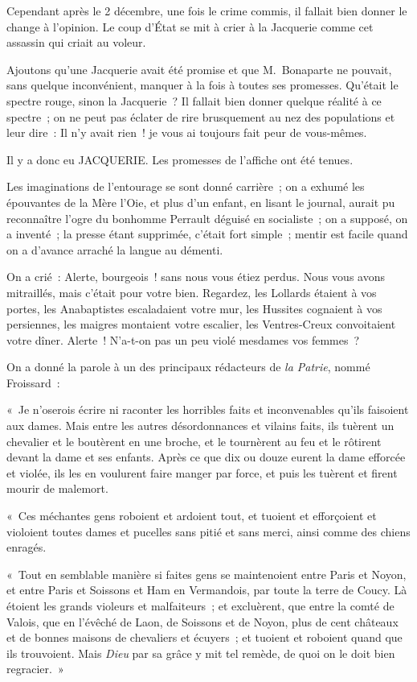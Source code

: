 \documentclass[french,twoside]{book} %
\newenvironment{quoteblock}%
  {\begin{quoting}}
  {\end{quoting}}
\newenvironment{quotebar}{%
    \def\FrameCommand{{\color{rubric!10!}\vrule width 0.5em} \hspace{0.9em}}%
    \def\OuterFrameSep{0pt} %
    \MakeFramed {\advance\hsize-\width \FrameRestore}
  }%
  {%
    \endMakeFramed
  }
\renewenvironment{quoteblock}%
  {%
    \savenotes
    \setstretch{0.9}
    \begin{quotebar}
    \smallskip
  }
  {%
    \smallskip
    \end{quotebar}
    \spewnotes
  }
\begin{document}
\noindent Cependant après le 2 décembre, une fois le crime commis, il fallait bien donner le change à l’opinion. Le coup d’État se mit à crier à la Jacquerie comme cet assassin qui criait au voleur.\par
Ajoutons qu’une Jacquerie avait été promise et que M. Bonaparte ne pouvait, sans quelque inconvénient, manquer à la fois à toutes ses promesses. Qu’était le spectre rouge, sinon la Jacquerie ? Il fallait bien donner quelque réalité à ce spectre ; on ne peut pas éclater de rire brusquement au nez des populations et leur dire : Il n’y avait rien ! je vous ai toujours fait peur de vous-mêmes.\par
Il y a donc eu JACQUERIE. Les promesses de l’affiche ont été tenues.\par
Les imaginations de l’entourage se sont donné carrière ; on a exhumé les épouvantes de la Mère l’Oie, et plus d’un enfant, en lisant le journal, aurait pu reconnaître l’ogre du bonhomme Perrault déguisé en socialiste ; on a supposé, on a inventé ; la presse étant supprimée, c’était fort simple ; mentir est facile quand on a d’avance arraché la langue au démenti.\par
On a crié : Alerte, bourgeois ! sans nous vous étiez perdus. Nous vous avons mitraillés, mais c’était pour votre bien. Regardez, les Lollards étaient à vos portes, les Anabaptistes escaladaient votre mur, les Hussites cognaient à vos persiennes, les maigres montaient votre escalier, les Ventres-Creux convoitaient votre dîner. Alerte ! N’a-t-on pas un peu violé mesdames vos femmes ?\par
On a donné la parole à un des principaux rédacteurs de \emph{la Patrie}, nommé Froissard :\par

\begin{quoteblock}
 \noindent « Je n’oserois écrire ni raconter les horribles faits et inconvenables qu’ils faisoient aux dames. Mais entre les autres désordonnances et vilains faits, ils tuèrent un chevalier et le boutèrent en une broche, et le tournèrent au feu et le rôtirent devant la dame et ses enfants. Après ce que dix ou douze eurent la dame efforcée et violée, ils les en voulurent faire manger par force, et puis les tuèrent et firent mourir de malemort.\par
 « Ces méchantes gens roboient et ardoient tout, et tuoient et efforçoient et violoient toutes dames et pucelles sans pitié et sans merci, ainsi comme des chiens enragés.\par
 « Tout en semblable manière si faites gens se maintenoient entre Paris et Noyon, et entre Paris et Soissons et Ham en Vermandois, par toute la terre de Coucy. Là étoient les grands violeurs et malfaiteurs ; et excluèrent, que entre la comté de Valois, que en l’évêché de Laon, de Soissons et de Noyon, plus de cent châteaux et de bonnes maisons de chevaliers et écuyers ; et tuoient et roboient quand que ils trouvoient. Mais \emph{Dieu} par sa grâce y mit tel remède, de quoi on le doit bien regracier. »
 \end{quoteblock}
\end{document}
